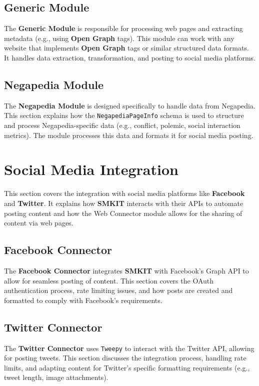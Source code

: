 \subsection{Generic Module}
\label{subsec:generic_module}
The \textbf{Generic Module} is responsible for processing web pages and extracting metadata (e.g., using \textbf{Open Graph} tags). This module can work with any website that implements \textbf{Open Graph} tags or similar structured data formats. It handles data extraction, transformation, and posting to social media platforms.

\subsection{Negapedia Module}
\label{subsec:negapedia_module}
The \textbf{Negapedia Module} is designed specifically to handle data from Negapedia. This section explains how the \texttt{NegapediaPageInfo} schema is used to structure and process Negapedia-specific data (e.g., conflict, polemic, social interaction metrics). The module processes this data and formats it for social media posting.

\section{Social Media Integration}
\label{sec:social_media_integration}
This section covers the integration with social media platforms like \textbf{Facebook} and \textbf{Twitter}. It explains how \textbf{SMKIT} interacts with their APIs to automate posting content and how the Web Connector module allows for the sharing of content via web pages.

\subsection{Facebook Connector}
\label{subsec:facebook_connector}
The \textbf{Facebook Connector} integrates \textbf{SMKIT} with Facebook’s Graph API to allow for seamless posting of content. This section covers the OAuth authentication process, rate limiting issues, and how posts are created and formatted to comply with Facebook's requirements.

\subsection{Twitter Connector}
\label{subsec:twitter_connector}
The \textbf{Twitter Connector} uses \texttt{Tweepy} to interact with the Twitter API, allowing for posting tweets. This section discusses the integration process, handling rate limits, and adapting content for Twitter's specific formatting requirements (e.g., tweet length, image attachments).

